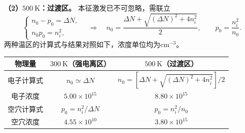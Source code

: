 \begin{problem}
    \textbf{（2）$500\ \mathrm{K}$：过渡区。}
    本征激发已不可忽略，需联立
    \[
    \begin{cases}
        n_0-p_0=\Delta N,\\
        n_0p_0=n_i^2,
    \end{cases}
    \quad\Longrightarrow\quad
    n_0=\frac{\Delta N+\sqrt{(\Delta N)^2+4n_i^2}}{2},
    \qquad p_0=\frac{n_i^2}{n_0}.
    \]
    两种温区的计算式与结果对照如下，浓度单位均为$\mathrm{cm}^{-3}$。
    \begin{center}
        \small
        \begin{tabular}{c c c}
            \hline
            物理量 & $300\ \mathrm{K}$（强电离区） & $500\ \mathrm{K}$（过渡区） \\
            \hline
            电子计算式 & $n_0\simeq\Delta N$ & $n_0=[\Delta N+\sqrt{(\Delta N)^2+4n_i^2}]/2$ \\
            电子浓度 & $\boxed{5.00\times10^{15}}$ & $\boxed{8.80\times10^{15}}$ \\
            空穴计算式 & $p_0=n_i^2/\Delta N$ & $p_0=n_i^2/n_0$ \\
            空穴浓度 & $\boxed{4.55\times10^{10}}$ & $\boxed{3.80\times10^{15}}$ \\
            \hline
        \end{tabular}
    \end{center}
\end{problem}

